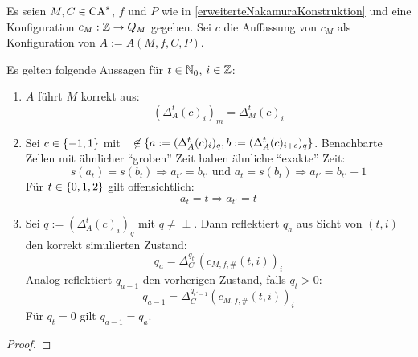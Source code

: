 \begin{satz}
    Es seien $M, C \in \textrm{CA}^*$, $f$ und $P$ wie in \cref{erweiterteNakamuraKonstruktion} und eine Konfiguration $c_M: \mathbb{Z} \to Q_M$ gegeben.
    Sei $c$ die Auffassung von $c_M$ als Konfiguration von $A := A(M, f, C, P)$.
    
    Es gelten folgende Aussagen für $t \in \mathbb{N}_0$, $i \in \mathbb{Z}$:
    
    \begin{enumerate}
        \item
            $A$ führt $M$ korrekt aus:
            \[
                (\Delta_A^t(c)_i)_m = \Delta_M^t(c)_i
            \]
        \item
            Sei $c \in \{ {-1, 1} \}$ mit $\perp \not \in \{ {a := (\Delta_A^t(c)_i)_q, b := (\Delta_A^t(c)_{i+c})_q} \}$.
            Benachbarte Zellen mit ähnlicher \enquote{groben} Zeit haben ähnliche \enquote{exakte} Zeit:
            \[
                s(a_{t}) = s(b_{t}) \Rightarrow a_{t'} = b_{t'} \text{ und }  a_{t} = s(b_{t}) \Rightarrow a_{t'} = b_{t'} + 1
            \]
            Für $t \in \{ {0, 1, 2} \}$ gilt offensichtlich:
            \[
                a_{t} = t \Rightarrow a_{t'} = t
            \]
        \item
            Sei $q := (\Delta_A^t(c)_i)_q$ mit $q \neq \perp$.
            Dann reflektiert $q_a$ aus Sicht von $(t, i)$ den korrekt simulierten Zustand:
            \[
                q_a = \Delta_C^{q_{t'}}(c_{M, f, \#}(t, i))_i
            \]
            Analog reflektiert $q_{a-1}$ den vorherigen Zustand, falls $q_t > 0$:
            \[
                q_{a-1} = \Delta_C^{q_{t' - 1}}(c_{M, f, \#}(t, i))_i
            \]
            Für $q_t = 0$ gilt $q_{a-1} = q_a$.
    \end{enumerate}
\end{satz}
\begin{proof}
    
\end{proof}

